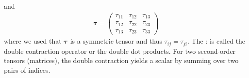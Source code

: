 \documentclass[a4paper]{article}
\begin{document}
and 
\begin{align*}
    \bm{\tau} = 
\begin{pmatrix}
  \tau_{11} & \tau_{12} & \tau_{13} \\
  \tau_{12} & \tau_{22} & \tau_{23} \\
  \tau_{13} & \tau_{23} & \tau_{33}
\end{pmatrix}
\end{align*}
where we used that $\bm{\tau}$ is a symmetric tensor and thus $\tau_{ij} = \tau_{ji}$.  
The : is called the double contraction operator or the double dot products. For two second-order tensors (matrices), the double contraction yields a scalar by summing over 
two pairs of indices. 

\printbibliography[heading=bibintoc, title={References}]
\end{document}
